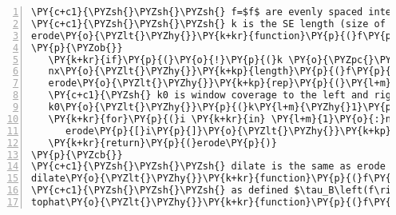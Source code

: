 \begin{Verbatim}[commandchars=\\\{\},codes={\catcode`\$=3\catcode`\^=7\catcode`\_=8},gobble=0,numbers=left,fontfamily=fvm,fontshape=n,fontsize=\footnotesize,tabsize=2]
\PY{c+c1}{\PYZsh{}\PYZsh{}\PYZsh{} f=$f$ are evenly spaced intensity values}
\PY{c+c1}{\PYZsh{}\PYZsh{}\PYZsh{} k is the SE length (size of $B$)}
erode\PY{o}{\PYZlt{}\PYZhy{}}\PY{k+kr}{function}\PY{p}{(}f\PY{p}{,}k\PY{p}{)} \PY{c+c1}{\PYZsh{}f are the intensities}
\PY{p}{\PYZob{}} 
   \PY{k+kr}{if}\PY{p}{(}\PY{o}{!}\PY{p}{(}k \PY{o}{\PYZpc{}\PYZpc{}} \PY{l+m}{2}\PY{p}{)}\PY{p}{)} \PY{k+kr}{return}\PY{p}{(}\PY{k+kc}{NULL}\PY{p}{)} \PY{c+c1}{\PYZsh{}SE must be of odd length}
   nx\PY{o}{\PYZlt{}\PYZhy{}}\PY{k+kp}{length}\PY{p}{(}f\PY{p}{)}
   erode\PY{o}{\PYZlt{}\PYZhy{}}\PY{k+kp}{rep}\PY{p}{(}\PY{l+m}{0}\PY{p}{,}nx\PY{p}{)}
   \PY{c+c1}{\PYZsh{} k0 is window coverage to the left and right of centre}
   k0\PY{o}{\PYZlt{}\PYZhy{}}\PY{p}{(}k\PY{l+m}{\PYZhy{}1}\PY{p}{)}\PY{o}{/}\PY{l+m}{2}
   \PY{k+kr}{for}\PY{p}{(}i \PY{k+kr}{in} \PY{l+m}{1}\PY{o}{:}nx\PY{p}{)} \PY{c+c1}{\PYZsh{}for each m/z point across the spectrum}
      erode\PY{p}{[}i\PY{p}{]}\PY{o}{\PYZlt{}\PYZhy{}}\PY{k+kp}{min}\PY{p}{(}f\PY{p}{[}\PY{k+kp}{max}\PY{p}{(}\PY{l+m}{1}\PY{p}{,}i\PY{o}{\PYZhy{}}k0\PY{p}{)}\PY{o}{:}\PY{k+kp}{min}\PY{p}{(}nx\PY{p}{,}i\PY{o}{+}k0\PY{p}{)}\PY{p}{]}\PY{p}{)}
   \PY{k+kr}{return}\PY{p}{(}erode\PY{p}{)}
\PY{p}{\PYZcb{}} 
\PY{c+c1}{\PYZsh{}\PYZsh{}\PYZsh{} dilate is the same as erode except use max instead of min, or:}
dilate\PY{o}{\PYZlt{}\PYZhy{}}\PY{k+kr}{function}\PY{p}{(}f\PY{p}{,}k\PY{p}{)} \PY{k+kr}{return}\PY{p}{(}\PY{o}{\PYZhy{}}erode\PY{p}{(}\PY{o}{\PYZhy{}}f\PY{p}{,}k\PY{p}{)}\PY{p}{)}
\PY{c+c1}{\PYZsh{}\PYZsh{}\PYZsh{} as defined $\tau_B\left(f\right)=f-\left(f\ominus{B}\right)\oplus{B}$}
tophat\PY{o}{\PYZlt{}\PYZhy{}}\PY{k+kr}{function}\PY{p}{(}f\PY{p}{,}k\PY{p}{)} \PY{k+kr}{return}\PY{p}{(}f\PY{o}{\PYZhy{}}dilate\PY{p}{(}erode\PY{p}{(}f\PY{p}{,}k\PY{p}{)}\PY{p}{,}k\PY{p}{)}\PY{p}{)}
\end{Verbatim}
